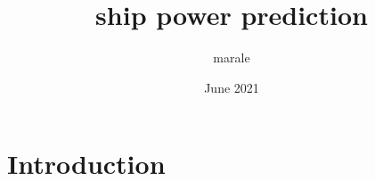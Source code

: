\documentclass{article}
\title{ship power prediction}
\author{marale }
\date{June 2021}
\begin{document}
\maketitle

\section{Introduction}
\end{document}
